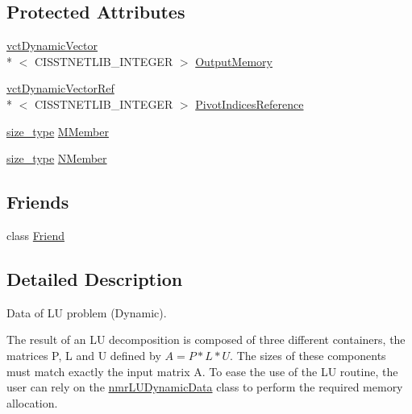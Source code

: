 \subsection*{Protected Attributes}
\begin{DoxyCompactItemize}
\item 
\hyperlink{classvct_dynamic_vector}{vct\-Dynamic\-Vector}\\*
$<$ C\-I\-S\-S\-T\-N\-E\-T\-L\-I\-B\-\_\-\-I\-N\-T\-E\-G\-E\-R $>$ \hyperlink{classnmr_l_u_dynamic_data_acf9e9d0bb436f0e04c6d6138b1cbd8fd}{Output\-Memory}
\item 
\hyperlink{classvct_dynamic_vector_ref}{vct\-Dynamic\-Vector\-Ref}\\*
$<$ C\-I\-S\-S\-T\-N\-E\-T\-L\-I\-B\-\_\-\-I\-N\-T\-E\-G\-E\-R $>$ \hyperlink{classnmr_l_u_dynamic_data_a45c056cf29f16a5e97fafee6484a009e}{Pivot\-Indices\-Reference}
\end{DoxyCompactItemize}
{\bf }\par
\begin{DoxyCompactItemize}
\item 
\hyperlink{classnmr_l_u_dynamic_data_a63259a289f8f94498b5102ce39722bbe}{size\-\_\-type} \hyperlink{classnmr_l_u_dynamic_data_a859065b13cb287c4e0e67be01f9a779b}{M\-Member}
\item 
\hyperlink{classnmr_l_u_dynamic_data_a63259a289f8f94498b5102ce39722bbe}{size\-\_\-type} \hyperlink{classnmr_l_u_dynamic_data_a44878cc0e7c2c01ea964a57d447b64bb}{N\-Member}
\end{DoxyCompactItemize}

\subsection*{Friends}
\begin{DoxyCompactItemize}
\item 
class \hyperlink{classnmr_l_u_dynamic_data_a7f8321d57e81bc613d5dbef3410ba70e}{Friend}
\end{DoxyCompactItemize}


\subsection{Detailed Description}
Data of L\-U problem (Dynamic). 

The result of an L\-U decomposition is composed of three different containers, the matrices P, L and U defined by $ A = P * L * U$. The sizes of these components must match exactly the input matrix A. To ease the use of the L\-U routine, the user can rely on the \hyperlink{classnmr_l_u_dynamic_data}{nmr\-L\-U\-Dynamic\-Data} class to perform the required memory allocation.

